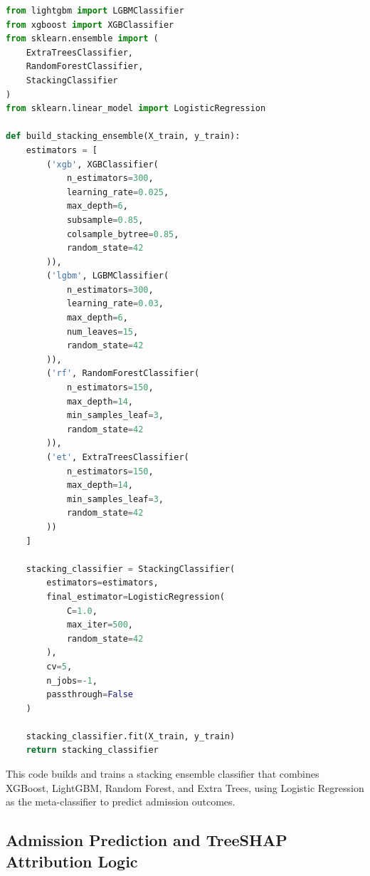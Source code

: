 \begin{lstlisting}[language=Python]
from lightgbm import LGBMClassifier
from xgboost import XGBClassifier
from sklearn.ensemble import (
    ExtraTreesClassifier,
    RandomForestClassifier,
    StackingClassifier
)
from sklearn.linear_model import LogisticRegression

def build_stacking_ensemble(X_train, y_train):
    estimators = [
        ('xgb', XGBClassifier(
            n_estimators=300,
            learning_rate=0.025,
            max_depth=6,
            subsample=0.85,
            colsample_bytree=0.85,
            random_state=42
        )),
        ('lgbm', LGBMClassifier(
            n_estimators=300,
            learning_rate=0.03,
            max_depth=6,
            num_leaves=15,
            random_state=42
        )),
        ('rf', RandomForestClassifier(
            n_estimators=150,
            max_depth=14,
            min_samples_leaf=3,
            random_state=42
        )),
        ('et', ExtraTreesClassifier(
            n_estimators=150,
            max_depth=14,
            min_samples_leaf=3,
            random_state=42
        ))
    ]

    stacking_classifier = StackingClassifier(
        estimators=estimators,
        final_estimator=LogisticRegression(
            C=1.0,
            max_iter=500,
            random_state=42
        ),
        cv=5,
        n_jobs=-1,
        passthrough=False
    )

    stacking_classifier.fit(X_train, y_train)
    return stacking_classifier
\end{lstlisting}
This code builds and trains a stacking ensemble classifier that combines XGBoost, LightGBM, Random Forest, and Extra Trees, using Logistic Regression as the meta-classifier to predict admission outcomes.


\clearpage
\subsection{Admission Prediction and TreeSHAP Attribution Logic}


